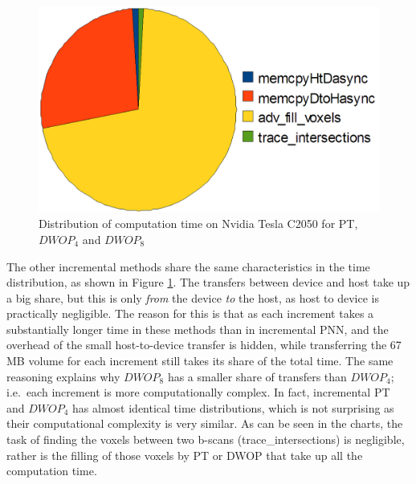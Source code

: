 \begin{figure}[h]
	\includegraphics[height=0.175\textheight]{charts/incr_hq_3.png}
	\caption[Distribution of computation time for PT, $DWOP_4$ and $DWOP_8$]{Distribution of computation time on Nvidia Tesla C2050 for PT, $DWOP_4$ and $DWOP_8$}
	\label{fig:incr_hq_pie}
	\end{figure}
	
	The other incremental methods share the same characteristics in the time distribution, as shown in Figure \ref{fig:incr_hq_pie}. The transfers between device and host take up a big share, but this is only \emph{from} the device \emph{to} the host, as host to device is practically negligible. The reason for this is that as each increment takes a substantially longer time in these methods than in incremental PNN, and the overhead of the small host-to-device transfer is hidden, while transferring the 67 MB volume for each increment still takes its share of the total time. The same reasoning explains why $DWOP_8$ has a smaller share of transfers than $DWOP_4$; i.e.\ each increment is more computationally complex. In fact, incremental PT and $DWOP_4$ has almost identical time distributions, which is not surprising as their computational complexity is very similar. As can be seen in the charts, the task of finding the voxels between two b-scans (trace\_intersections) is negligible, rather is the filling of those voxels by PT or DWOP that take up all the computation time.
	
